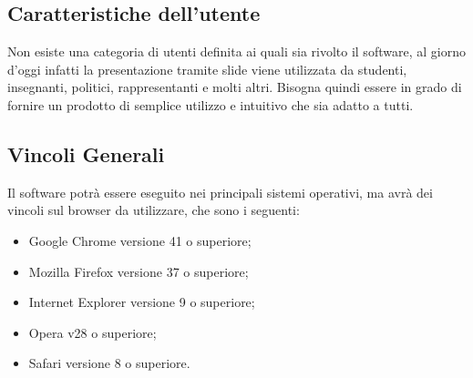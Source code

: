 \subsection{Caratteristiche dell'utente}
Non esiste una categoria di utenti definita ai quali sia rivolto il software, al giorno d'oggi infatti la presentazione tramite \gls{slide} viene utilizzata da studenti, insegnanti, politici, rappresentanti e molti altri. Bisogna quindi essere in grado di fornire un prodotto di semplice utilizzo e intuitivo che sia adatto a tutti.

\subsection{Vincoli Generali}
Il software potrà essere eseguito nei principali sistemi operativi, ma avrà dei vincoli sul \gls{browser} da utilizzare, che sono i seguenti:
\begin{itemize}
	\item Google Chrome versione 41 o superiore;
	\item Mozilla Firefox versione 37 o superiore;
	\item Internet Explorer versione 9 o superiore;
	\item Opera v28 o superiore;
	\item Safari versione 8 o superiore.
\end{itemize}

